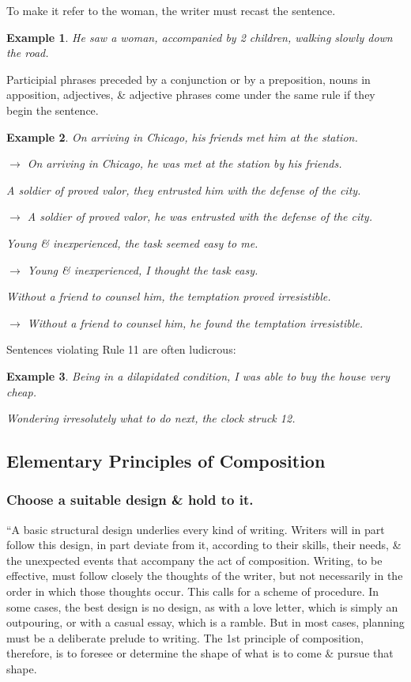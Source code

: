 \documentclass{article}
\newtheorem{example}{Example}
\begin{document}
To make it refer to the woman, the writer must recast the sentence.
\begin{example}
	He saw a woman, accompanied by 2 children, walking slowly down the road.
\end{example}
Participial phrases preceded by a conjunction or by a preposition, nouns in apposition, adjectives, \& adjective phrases come under the same rule if they begin the sentence.
\begin{example}
	On arriving in Chicago, his friends met him at the station.
	
	$\to$ On arriving in Chicago, he was met at the station by his friends.
	
	A soldier of proved valor, they entrusted him with the defense of the city.
	
	$\to$ A soldier of proved valor, he was entrusted with the defense of the city.
	
	Young \& inexperienced, the task seemed easy to me.
	
	$\to$ Young \& inexperienced, I thought the task easy.
	
	Without a friend to counsel him, the temptation proved irresistible.
	
	$\to$ Without a friend to counsel him, he found the temptation irresistible.
\end{example}
Sentences violating Rule 11 are often ludicrous:
\begin{example}
	Being in a dilapidated condition, I was able to buy the house very cheap.
	
	Wondering irresolutely what to do next, the clock struck 12.
\end{example}


\subsection{Elementary Principles of Composition}

\subsubsection{Choose a suitable design \& hold to it.}
``A basic structural design underlies every kind of writing. Writers will in part follow this design, in part deviate from it, according to their skills, their needs, \& the unexpected events that accompany the act of composition. Writing, to be effective, must follow closely the thoughts of the writer, but not necessarily in the order in which those thoughts occur. This calls for a scheme of procedure. In some cases, the best design is no design, as with a love letter, which is simply an outpouring, or with a casual essay, which is a ramble. But in most cases, planning must be a deliberate prelude to writing. The 1st principle of composition, therefore, is to foresee or determine the shape of what is to come \& pursue that shape.
\end{document}

